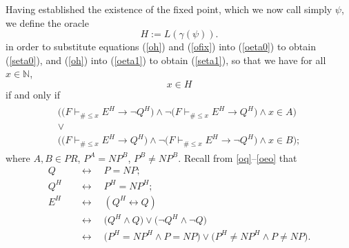 \documentclass[letterpaper]{article}
\newcommand{\Construction}{{\large\dsmathematical}}
\begin{document}
\begin{construction}
Having established the existence of the fixed point, which we now call simply $\psi$, we define the oracle
\begin{equation}
H:=L(\gamma(\psi)).\label{oh}
\end{equation}
in order to substitute equations (\ref{oh}) and (\ref{ofix}) into (\ref{oeta0}) to obtain (\ref{seta0}), and (\ref{oh}) into (\ref{oeta1}) to obtain (\ref{seta1}), so that we have for all $x\in\mathbb N$,
\begin{equation}
x\in H\label{seta0}
\end{equation}
if and only if
\begin{align}
\begin{gathered}\label{seta1}
\Big(\big(F\vdash_{\#\le x}E^H\rightarrow \lnot Q^H\big)
\land\lnot\big(F\vdash_{\#\le x}E^H\rightarrow Q^H\big)
\land x\in A\Big) \\
\lor\\
\Big(\big(F\vdash_{\#\le x}E^H\rightarrow Q^H\big)
\land\lnot\big(F\vdash_{\#\le x}E^H\rightarrow \lnot Q^H\big)
\land x\in B\Big);
\end{gathered}
\end{align}
where $A, B \in PR$, $P^A=NP^B$, $P^B\ne NP^B$.  Recall from \Construction\Construction \ref{oq}--\ref{oeo} that
\begin{align}
Q\quad&\longleftrightarrow\quad P=NP;\label{sq}\\
Q^H\quad&\longleftrightarrow\quad P^H=NP^H;\label{sqh}\\
E^H\quad&\longleftrightarrow\quad (Q^H\longleftrightarrow Q)\label{seh}\\
\quad&\longleftrightarrow\quad\big(Q^H\land Q\big)\lor\big(\lnot Q^H\land\lnot Q\big)\label{sehv}\\
&\longleftrightarrow\quad \big(P^H=NP^H\land P=NP\big)\lor\big(P^H\ne NP^H\land P\ne NP\big).\label{sehx}
\end{align}
\end{construction}
\end{document}
